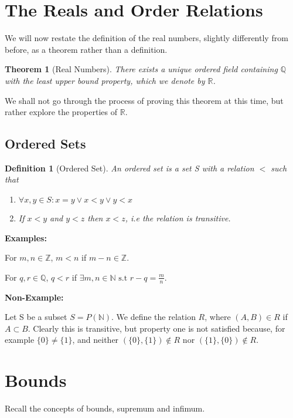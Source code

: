 \documentclass[12pt]{article}
\newtheorem{theorem}{Theorem}
\newtheorem{definition}{Definition}
\begin{document}
\section*{The Reals and Order Relations}
We will now restate the definition of the real numbers, slightly 
differently from before, as a theorem rather than a definition.
\begin{theorem}[Real Numbers]
    There exists a unique ordered field
    containing \(\mathbb Q\) with the least upper bound property, 
    which we denote by \(\mathbb R\).
\end{theorem}

\noindent 
We shall not go through the process of proving this theorem at this 
time, but rather explore the properties of \(\mathbb R\).

\subsection*{Ordered Sets}
\begin{definition}[Ordered Set]
    An ordered set is a set S with a relation \(<\) 
    such that 
    \begin{enumerate}
        \item \(\forall x,y \in S : x=y \lor x < y \lor y < x\)
        \item If \(x < y\) and \(y < z\) then \(x < z\), i.e 
            the relation is transitive.
    \end{enumerate}
\end{definition}

\noindent 
\textbf{Examples:}

\noindent 
For \(m,n \in \mathbb Z\), \(m < n\) if \(m-n \in \mathbb Z\).

\noindent 
For \(q,r \in \mathbb Q\), \(q < r\) if 
\(\exists m,n \in \mathbb N \text{ s.t } r-q = \frac{m}{n}\).

\noindent 
\textbf{Non-Example:}

\noindent 
Let S be a subset \(S = P(\mathbb N)\). 
We define the relation \(R\), where \((A,B) \in R\) 
if \(A \subset B\). Clearly this is transitive, but
property one is not satisfied because, for example
\(\{0\} \neq \{1\}\), and neither \((\{0\}, \{1\}) \not\in R\) nor
\((\{1\}, \{0\}) \not\in R\).

\section*{Bounds}
Recall the concepts of bounds, supremum and infimum. 
\end{document}
